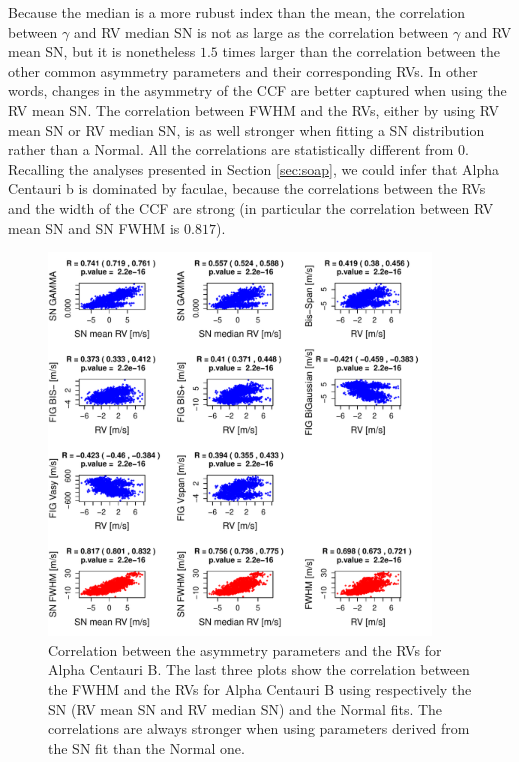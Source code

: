 \documentclass[11pt, oneside]{article}
\begin{document}
Because the median is a more rubust index than the mean, the correlation between $\gamma$ and RV median SN is not as large as the correlation between $\gamma$ and RV mean SN, but it is nonetheless $1.5$ times larger than the correlation between the other common asymmetry parameters and their corresponding RVs. In other words, changes in the asymmetry of the CCF are better captured when using the RV mean SN. The correlation between FWHM and the RVs, either by using RV mean SN or RV median SN, is as well stronger when fitting a SN distribution rather than a Normal. All the correlations are statistically different from $0$. Recalling the analyses presented in Section \ref{sec:soap}, we could infer that Alpha Centauri b is dominated by faculae, because the correlations between the RVs and the width of the CCF are strong (in particular the correlation between RV mean SN and SN FWHM is $0.817$).
%
\begin{figure}[htbp]
   \centering
\includegraphics[height = 4in]{HD12862_[4]Comparison_para.pdf}  
   \caption{Correlation between the asymmetry parameters and the RVs for Alpha Centauri B. The last three plots show the correlation between the FWHM and the RVs for Alpha Centauri B using respectively the SN (RV mean SN and RV median SN) and the Normal fits. The correlations are always stronger when using parameters derived from the SN fit than the Normal one.}
   \label{fig:alphacent:corrPlot}
\end{figure}
%
\end{document}
